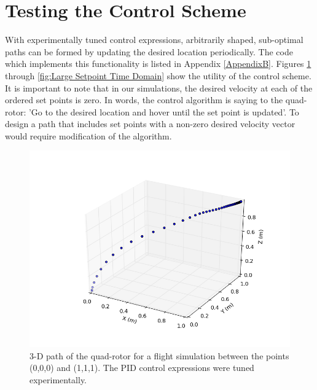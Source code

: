 \section{Testing the Control Scheme}

With experimentally tuned control expressions, arbitrarily shaped, sub-optimal paths can be formed by updating the desired location periodically. The code which implements this functionality is listed in Appendix \ref{AppendixB}. Figures \ref{fig:Typical Run 3D Path} through \ref{fig:Large Setpoint Time Domain} show the utility of the control scheme. It is important to note that in our simulations, the desired velocity at each of the ordered set points is zero. In words, the control algorithm is saying to the quad-rotor: 'Go to the desired location and hover until the set point is updated'. To design a path that includes set points with a non-zero desired velocity vector would require modification of the algorithm.
\begin{figure}[htbp]
	\centering
		\includegraphics[scale = 0.4]{Figures/typical_run_time_3D_path.png}
	\caption[Typical Run 3D Path]{3-D path of the quad-rotor for a flight simulation between the points (0,0,0) and (1,1,1). The PID control expressions were tuned experimentally.}
	\label{fig:Typical Run 3D Path}
\end{figure}
